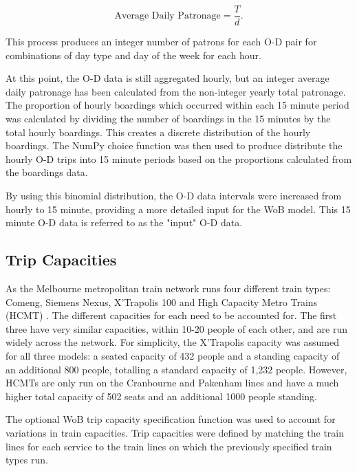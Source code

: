 \begin{equation}
    \text{Average Daily Patronage} = \frac{T}{d}.
    \label{eqn:averagedailypatronage}
\end{equation}

This process produces an integer number of patrons for each O-D pair for combinations of day type and day of the week for each hour. 

At this point, the O-D data is still aggregated hourly, but an integer average daily patronage has been calculated from the non-integer yearly total patronage. The proportion of hourly boardings which occurred within each 15 minute period was calculated by dividing the number of boardings in the 15 minutes by the total hourly boardings. This creates a discrete distribution of the hourly boardings. The NumPy choice function was then used to produce distribute the hourly O-D trips into 15 minute periods based on the proportions calculated from the boardings data. 

By using this binomial distribution, the O-D data intervals were increased from hourly to 15 minute, providing a more detailed input for the WoB model. This 15 minute O-D data is referred to as the "input" O-D data. 

\subsection{Trip Capacities}
As the Melbourne metropolitan train network runs four different train types: Comeng, Siemens Nexus, X'Trapolis 100 and High Capacity Metro Trains (HCMT) \cite{VICSIGRollingstock}. The different capacities for each need to be accounted for. The first three have very similar capacities, within 10-20 people of each other, and are run widely across the network. For simplicity, the X'Trapolis capacity was assumed for all three models: a seated capacity of 432 people and a standing capacity of an additional 800 people, totalling a standard capacity of 1,232 people. However, HCMTs are only run on the Cranbourne and Pakenham lines and have a much higher total capacity of 502 seats and an additional 1000 people standing. 

The optional WoB trip capacity specification function was used to account for variations in train capacities. Trip capacities were defined by matching the train lines for each service to the train lines on which the previously specified train types run. 

